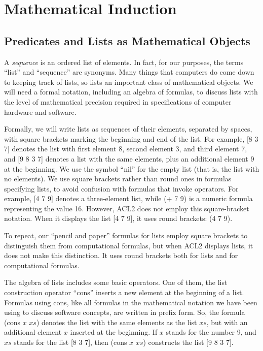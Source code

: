 \chapter{Mathematical Induction}
\label{ch:mathematical-induction}

\section{Predicates and Lists as Mathematical Objects}
\label{sec:lists-as-obj}
A \emph{sequence} is an ordered list of elements.
In fact, for our purposes, the terms ``list'' and ``sequence'' are synonyms.
Many things that computers do come down to keeping track of lists,
so lists an important class of mathematical objects.
We will need a formal notation, including an algebra of formulas,
to discuss lists with the level of mathematical precision
required in specifications of computer hardware and software.

Formally, we will write lists as sequences of their elements, separated by spaces,
with square brackets marking the beginning and end of the list.
For example, [8 3 7] denotes the list with first element 8,
second element 3, and third element 7, and
[9 8 3 7] denotes a list with the same elements,
plus an additional element 9 at the beginning.
\label{nil-def}
We use the symbol ``nil'' for the empty list
(that is, the list with no elements).
\label{square-brackets}
We use square brackets rather than round ones in formulas
specifying lists, to avoid confusion with formulas that invoke operators.
For example, [4 7 9] denotes a three-element list,
while (+ 7 9) is a numeric formula representing the value 16.
However, ACL2 does not employ this square-bracket notation.
When it displays the list [4 7 9],
it uses round brackets: (4 7 9).

To repeat, our ``pencil and paper'' formulas for lists
employ square brackets to distinguish them from computational formulas,
but when ACL2 displays lists, it does not make this distinction.
It uses round brackets both for lists and for computational formulas.

The algebra of lists includes some basic operators.
One of them, the list construction operator ``cons''
inserts a new element at the beginning of a list.
Formulas using cons, like all formulas in
the mathematical notation we have been using to discuss software concepts,
are written in prefix form.
So, the formula (cons $x$ $xs$) denotes the list
with the same elements as the list $xs$,
but with an additional element $x$ inserted at the beginning.
If $x$ stands for the number 9,
and $xs$ stands for the list [8 3 7],
then (cons $x$ $xs$) constructs the list [9 8 3 7].

